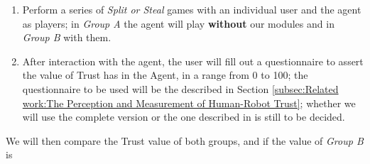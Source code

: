 \begin{enumerate}
	\item Perform a series of \textit{Split or Steal} games with an individual user and the agent as players; in \textit{Group A} the agent will play \textbf{without} our modules and in \textit{Group B} with them.
	\item After interaction with the agent, the user will fill out a questionnaire to assert the value of Trust has in the Agent, in a range from 0 to 100; the questionnaire to be used will be the described in Section \ref{subsec:Related work:The Perception and Measurement of Human-Robot Trust}; whether we will use the complete version or the one described in %
	is still to be decided.
\end{enumerate}

We will then compare the Trust value of both groups, and if the value of \textit{Group B} is 